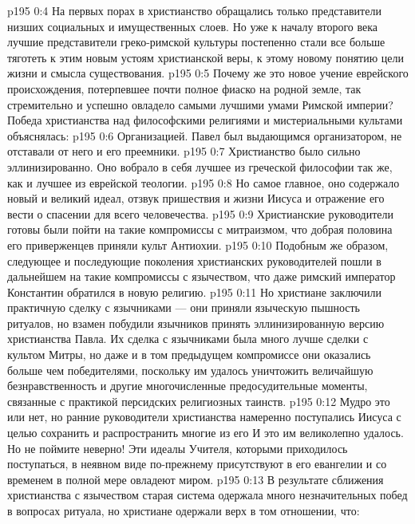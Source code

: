 \vs p195 0:4 \pc На первых порах в христианство обращались только представители низших социальных и имущественных слоев. Но уже к началу второго века лучшие представители греко\hyp{}римской культуры постепенно стали все больше тяготеть к этим новым устоям христианской веры, к этому новому понятию цели жизни и смысла существования.
\vs p195 0:5 Почему же это новое учение еврейского происхождения, потерпевшее почти полное фиаско на родной земле, так стремительно и успешно овладело самыми лучшими умами Римской империи? Победа христианства над философскими религиями и мистериальными культами объяснялась:
\vs p195 0:6 \bibnobreakspace Организацией. Павел был выдающимся организатором, не отставали от него и его преемники.
\vs p195 0:7 \bibnobreakspace Христианство было сильно эллинизированно. Оно вобрало в себя лучшее из греческой философии так же, как и лучшее из еврейской теологии.
\vs p195 0:8 \bibnobreakspace Но самое главное, оно содержало новый и великий идеал, отзвук пришествия и жизни Иисуса и отражение его вести о спасении для всего человечества.
\vs p195 0:9 \bibnobreakspace Христианские руководители готовы были пойти на такие компромиссы с митраизмом, что добрая половина его приверженцев приняли культ Антиохии.
\vs p195 0:10 \bibnobreakspace Подобным же образом, следующее и последующие поколения христианских руководителей пошли в дальнейшем на такие компромиссы с язычеством, что даже римский император Константин обратился в новую религию.
\vs p195 0:11 \pc Но христиане заключили практичную сделку с язычниками --- они приняли языческую пышность ритуалов, но взамен побудили язычников принять эллинизированную версию христианства Павла. Их сделка с язычниками была много лучше сделки с культом Митры, но даже и в том предыдущем компромиссе они оказались больше чем победителями, поскольку им удалось уничтожить величайшую безнравственность и другие многочисленные предосудительные моменты, связанные с практикой персидских религиозных таинств.
\vs p195 0:12 Мудро это или нет, но ранние руководители христианства намеренно поступались  Иисуса с целью сохранить и распространить многие из его  И это им великолепно удалось. Но не поймите неверно! Эти идеалы Учителя, которыми приходилось поступаться, в неявном виде по\hyp{}прежнему присутствуют в его евангелии и со временем в полной мере овладеют миром.
\vs p195 0:13 В результате сближения христианства с язычеством старая система одержала много незначительных побед в вопросах ритуала, но христиане одержали верх в том отношении, что:
